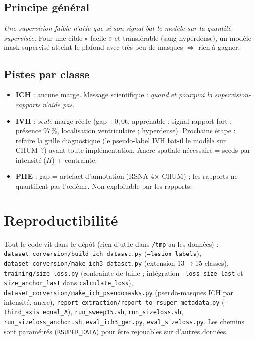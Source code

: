 \documentclass[11pt,a4paper]{article}
\begin{document}
\subsection{Principe général}
\emph{Une supervision faible n'aide que si son signal bat le modèle sur la quantité
supervisée.} Pour une cible « facile » et transférable (sang hyperdense), un modèle
mask-supervisé atteint le plafond avec très peu de masques $\Rightarrow$ rien à gagner.

\subsection{Pistes par classe}
\begin{itemize}[nosep]
  \item \textbf{ICH} : aucune marge. Message scientifique : \emph{quand et pourquoi la
  supervision-rapports n'aide pas}.
  \item \textbf{IVH} : \emph{seule} marge réelle (gap $+0{,}06$, apprenable ; signal-rapport
  fort : présence 97\,\%, localisation ventriculaire ; hyperdense). Prochaine étape :
  refaire la grille diagnostique (le pseudo-label IVH bat-il le modèle sur CHUM~?) avant
  toute implémentation. Ancre spatiale nécessaire = seeds par intensité ($H$) + contrainte.
  \item \textbf{PHE} : gap = artefact d'annotation (RSNA 4$\times$ CHUM) ; les rapports ne
  quantifient pas l'\oe dème. Non exploitable par les rapports.
\end{itemize}

\section{Reproductibilité}
Tout le code vit dans le dépôt (rien d'utile dans \texttt{/tmp} ou les données) :
\texttt{dataset\_conversion/build\_ich\_dataset.py} (\texttt{--lesion\_labels}),
\texttt{dataset\_conversion/make\_ich3\_dataset.py} (extension 13$\rightarrow$15 classes),
\texttt{training/size\_loss.py} (contrainte de taille ; intégration \texttt{--loss size\_last}
et \texttt{size\_anchor\_last} dans \texttt{calculate\_loss}),
\texttt{dataset\_conversion/make\_ich\_pseudomasks.py} (pseudo-masques ICH par intensité,
ancre),
\texttt{report\_extraction/report\_to\_rsuper\_metadata.py} (\texttt{--third\_axis equal\_A}),
\texttt{run\_sweep15.sh}, \texttt{run\_sizeloss.sh}, \texttt{run\_sizeloss\_anchor.sh},
\texttt{eval\_ich3\_gen.py}, \texttt{eval\_sizeloss.py}. Les chemins sont paramétrés
(\texttt{RSUPER\_DATA}) pour être rejouables sur d'autres données.
\end{document}
